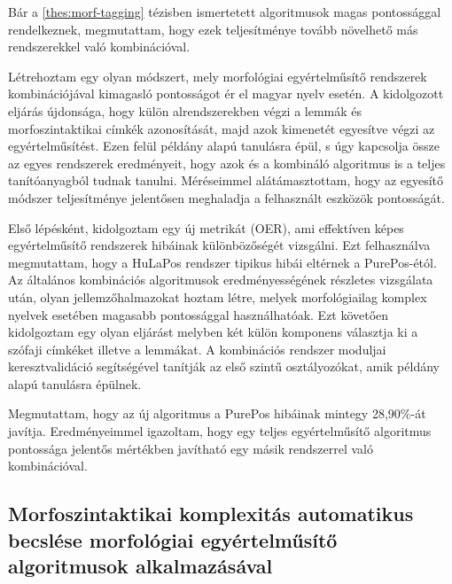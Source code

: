 \thesisline%


Bár a \ref{thes:morf-tagging} tézisben ismertetett algoritmusok magas pontossággal rendelkeznek, megmutattam, hogy ezek teljesítménye tovább növelhető más rendszerekkel való kombinációval. 

\begin{core}
\begin{thesis}
Létrehoztam egy olyan módszert, mely morfológiai egyértelműsítő rendszerek kombinációjával kimagasló pontosságot ér el magyar nyelv esetén.
A kidolgozott eljárás újdonsága, hogy külön alrendszerekben végzi a lemmák és morfoszintaktikai címkék azonosítását, majd azok kimenetét egyesítve végzi az egyértelműsítést.
Ezen felül példány alapú tanulásra épül, s úgy kapcsolja össze az egyes rendszerek eredményeit, hogy azok és a kombináló algoritmus is a teljes tanítóanyagból tudnak tanulni. 
Méréseimmel alátámasztottam, hogy az egyesítő módszer teljesítménye jelentősen meghaladja a felhasznált eszközök pontosságát. 
\end{thesis}

\begin{pub}
\cite{Laki2013a,Orosz2013c,Orosz2013d} 
\end{pub}
\end{core}

Első lépésként, kidolgoztam egy új metrikát (OER), ami effektíven képes egyértelműsítő rendszerek hibáinak különbözőségét vizsgálni. 
Ezt felhasználva megmutattam, hogy a HuLaPos rendszer tipikus hibái eltérnek a PurePos-étól. 
Az általános kombinációs algoritmusok eredményességének részletes vizsgálata után, olyan jellemzőhalmazokat hoztam létre, melyek morfológiailag komplex nyelvek esetében magasabb pontossággal használhatóak.
Ezt követően kidolgoztam egy olyan eljárást melyben két külön komponens választja ki a szófaji címkéket illetve a lemmákat. 
A kombinációs rendszer moduljai keresztvalidáció segítségével tanítják az első szintű osztályozókat, amik példány alapú tanulásra épülnek.

Megmutattam, hogy az új algoritmus a PurePos hibáinak mintegy 28,90\%-át javítja. 
Eredményeimmel igazoltam, hogy egy teljes egyértelműsítő algoritmus pontossága jelentős mértékben javítható egy másik rendszerrel való kombinációval. 

\subsection{Morfoszintaktikai komplexitás automatikus becslése morfológiai egyértelműsítő algoritmusok alkalmazásával}
\label{thes:mlu}

